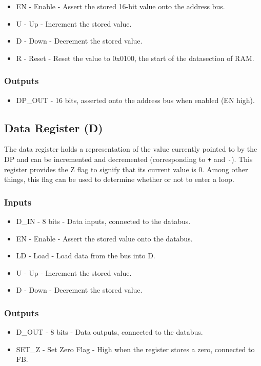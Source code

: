 \begin{itemize}
\itemsep0em 
\item EN - Enable - Assert the stored 16-bit value onto the address bus.
\item U - Up - Increment the stored value.
\item D - Down - Decrement the stored value.
\item R - Reset - Reset the value to 0x0100, the start of the datasection of RAM.
\end{itemize}

\subsubsection*{Outputs}
\begin{itemize}
\itemsep0em   
\item DP\_OUT - 16 bits, asserted onto the address bus when enabled (EN high).
\end{itemize}

\subsection{Data Register (D)} \label{sec:architecture:d}
The data register holds a representation of the value currently pointed to by the DP and can be incremented and decremented (corresponding to \texttt{+} and \texttt{-}). This register provides the Z flag to signify that its current value is 0. Among other things, this flag can be used to determine whether or not to enter a loop.

\subsubsection*{Inputs}
\begin{itemize}
\itemsep0em   
\item D\_IN - 8 bits - Data inputs, connected to the databus.
\item EN - Enable - Assert the stored value onto the databus.
\item LD - Load - Load data from the bus into D.
\item U - Up - Increment the stored value.
\item D - Down - Decrement the stored value.
\end{itemize}

\subsubsection*{Outputs}
\begin{itemize}
\itemsep0em 
\item D\_OUT - 8 bits - Data outputs, connected to the databus.
\item SET\_Z - Set Zero Flag - High when the register stores a zero, connected to FB.
\end{itemize}


